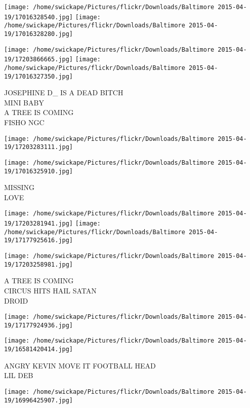 \documentclass[10pt,letterpaper]{article}
\begin{document}
\texttt{[image: /home/swickape/Pictures/flickr/Downloads/Baltimore 2015-04-19/17016328540.jpg]}
\texttt{[image: /home/swickape/Pictures/flickr/Downloads/Baltimore 2015-04-19/17016328280.jpg]}

\texttt{[image: /home/swickape/Pictures/flickr/Downloads/Baltimore 2015-04-19/17203866665.jpg]}
\texttt{[image: /home/swickape/Pictures/flickr/Downloads/Baltimore 2015-04-19/17016327350.jpg]}

JOSEPHINE D\_ IS A DEAD BITCH\\
MINI BABY\\
A TREE IS COMING\\
FISHO NGC\\
\pagebreak

\texttt{[image: /home/swickape/Pictures/flickr/Downloads/Baltimore 2015-04-19/17203283111.jpg]}

\vspace{0.25in}
\texttt{[image: /home/swickape/Pictures/flickr/Downloads/Baltimore 2015-04-19/17016325910.jpg]}

MISSING\\
LOVE\\
\pagebreak

\texttt{[image: /home/swickape/Pictures/flickr/Downloads/Baltimore 2015-04-19/17203281941.jpg]}
\texttt{[image: /home/swickape/Pictures/flickr/Downloads/Baltimore 2015-04-19/17177925616.jpg]}

\texttt{[image: /home/swickape/Pictures/flickr/Downloads/Baltimore 2015-04-19/17203258981.jpg]}

A TREE IS COMING\\
CIRCUS HITS HAIL SATAN\\
DROID\\
\pagebreak

\texttt{[image: /home/swickape/Pictures/flickr/Downloads/Baltimore 2015-04-19/17177924936.jpg]}

\vspace{0.25in}
\texttt{[image: /home/swickape/Pictures/flickr/Downloads/Baltimore 2015-04-19/16581420414.jpg]}

ANGRY KEVIN MOVE IT FOOTBALL HEAD\\
LIL DEB\\
\pagebreak

\texttt{[image: /home/swickape/Pictures/flickr/Downloads/Baltimore 2015-04-19/16996425907.jpg]}
\end{document}

